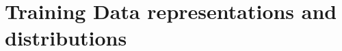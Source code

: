 \documentclass[12pt]{report}
\DeclareMathOperator{\nrm}{\mathrm{n}}
\DeclareMathOperator{\drm}{\mathrm{d}}
\DeclareMathOperator{\Xcal}{\mathcal{X}}
\DeclareMathOperator{\Ycal}{\mathcal{Y}}
\DeclareMathOperator{\Scal}{\mathcal{S}}
\DeclareMathOperator{\DMP}{\mathrm{DMP}}
\DeclareMathOperator{\uppsim}{\uppsi_\text{m}}
\begin{document}
%
%
%
%
%
%
%






\section{Training Data representations and distributions} \label{app:data_dist_cont}
\end{document}
